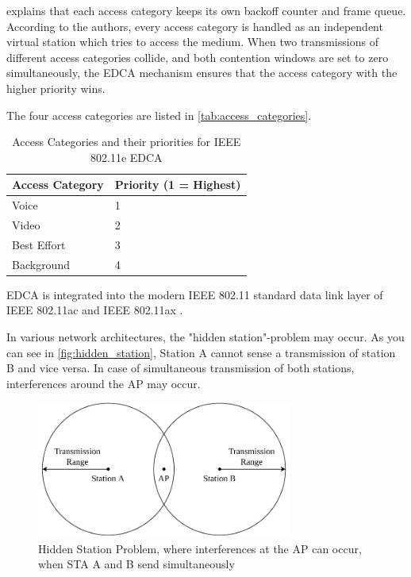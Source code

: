 \textcite{wu_ieee_2006} explains that each access category keeps its own backoff counter and frame queue.
According to the authors, every access category is handled as an independent virtual station which tries to access the medium.
When two transmissions of different access categories collide, and both contention windows are set to zero simultaneously,
the \ac{EDCA} mechanism ensures that the access category with the higher priority wins.

The four access categories are listed in \autoref{tab:access_categories}.
\begin{table}[H]
   \centering
   \begin{tabular}{>{\raggedright}p{2.5cm}p{3.2cm}}
      \toprule
      Access Category & Priority (1 = Highest)\\
      \midrule
      Voice & 1 \\
      Video & 2 \\
      Best Effort & 3 \\
      Background & 4 \\
      \bottomrule
   \end{tabular}
   \caption{Access Categories and their priorities for IEEE 802.11e \ac{EDCA} \cite{wu_ieee_2006}}
   \label{tab:access_categories}
\end{table}

\ac{EDCA} is integrated into the modern IEEE 802.11 standard data link layer of IEEE 802.11ac \cite{ieee_standard_2020}
and IEEE 802.11ax \cite{ieee_standard_2021ax}.

In various network architectures, the "hidden station"-problem may occur.
As you can see in \autoref{fig:hidden_station}, Station A cannot sense a transmission of station B and vice versa.
In case of simultaneous transmission of both stations, interferences around the \ac{AP} may occur.
\begin{figure}[H]%
   \centering
   \includegraphics[width=0.75\textwidth]{figures/hidden_station.pdf}
   \caption{Hidden Station Problem, where interferences at the \acf{AP} can occur, when \acf{STA} A and B send simultaneously}%
   \label{fig:hidden_station}%
\end{figure}

